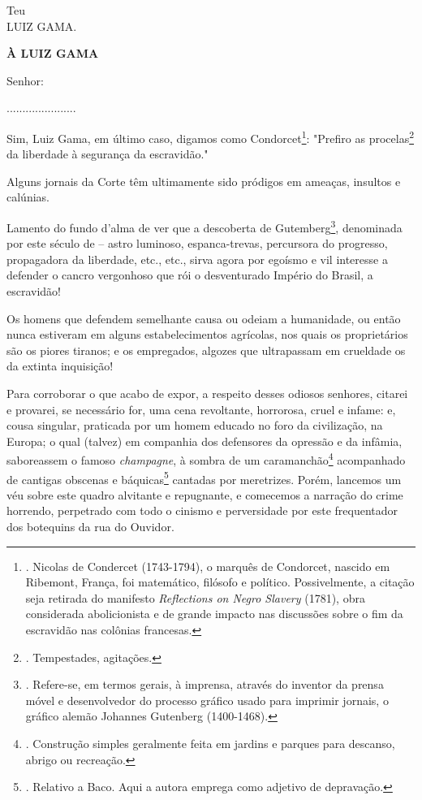 Teu\\
LUIZ GAMA.

\textbf{À LUIZ GAMA}

Senhor:

......................

Sim, Luiz Gama, em último caso, digamos como Condorcet\footnote{.
  Nicolas de Condercet (1743-1794), o marquês de Condorcet, nascido em
  Ribemont, França, foi matemático, filósofo e político. Possivelmente,
  a citação seja retirada do manifesto \emph{Reflections on Negro
  Slavery} (1781), obra considerada abolicionista e de grande impacto
  nas discussões sobre o fim da escravidão nas colônias francesas.}:
"Prefiro as procelas\footnote{. Tempestades, agitações.} da liberdade à
segurança da escravidão."

Alguns jornais da Corte têm ultimamente sido pródigos em ameaças,
insultos e calúnias.

Lamento do fundo d'alma de ver que a descoberta de Gutemberg\footnote{.
  Refere-se, em termos gerais, à imprensa, através do inventor da prensa
  móvel e desenvolvedor do processo gráfico usado para imprimir jornais,
  o gráfico alemão Johannes Gutenberg (1400-1468).}, denominada por este
século de -- astro luminoso, espanca-trevas, percursora do progresso,
propagadora da liberdade, etc., etc., sirva agora por egoísmo e vil
interesse a defender o cancro vergonhoso que rói o desventurado Império
do Brasil, a escravidão!

Os homens que defendem semelhante causa ou odeiam a humanidade, ou então
nunca estiveram em alguns estabelecimentos agrícolas, nos quais os
proprietários são os piores tiranos; e os empregados, algozes que
ultrapassam em crueldade os da extinta inquisição!

Para corroborar o que acabo de expor, a respeito desses odiosos
senhores, citarei e provarei, se necessário for, uma cena revoltante,
horrorosa, cruel e infame: e, cousa singular, praticada por um homem
educado no foro da civilização, na Europa; o qual (talvez) em companhia
dos defensores da opressão e da infâmia, saboreassem o famoso
\emph{champagne}, à sombra de um caramanchão\footnote{. Construção
  simples geralmente feita em jardins e parques para descanso, abrigo ou
  recreação.} acompanhado de cantigas obscenas e báquicas\footnote{.
  Relativo a Baco. Aqui a autora emprega como adjetivo de depravação.}
cantadas por meretrizes. Porém, lancemos um véu sobre este quadro
alvitante e repugnante, e comecemos a narração do crime horrendo,
perpetrado com todo o cinismo e perversidade por este frequentador dos
botequins da rua do Ouvidor.

